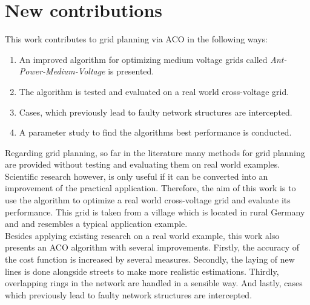 \newpage
\section{New contributions}
This work contributes to grid planning via ACO in the following ways:
\begin{enumerate}
	\setlength\itemsep{-0.5em}
	\item An improved algorithm for optimizing medium voltage grids called \textit{Ant-Power-Medium-Voltage} is presented.
	\item The algorithm is tested and evaluated on a real world cross-voltage grid.
	\item Cases, which previously lead to faulty network structures are intercepted.
	\item A parameter study to find the algorithms best performance is conducted.
\end{enumerate}

Regarding grid planning, so far in the literature many methods for grid planning are provided without testing and evaluating them on real world examples. Scientific research however, is only useful if it can be converted into an improvement of the practical application. Therefore, the aim of this work is to use the algorithm to optimize a real world cross-voltage grid and evaluate its performance. This grid is taken from a village which is located in rural Germany and and resembles a typical application example.\\
Besides applying existing research on a real world example, this work also presents an ACO algorithm with several improvements. Firstly, the accuracy of the cost function is increased by several measures. Secondly, the laying of new lines is done alongside streets to make more realistic estimations. Thirdly, overlapping rings in the network are handled in a sensible way. And lastly, cases which previously lead to faulty network structures are intercepted.









